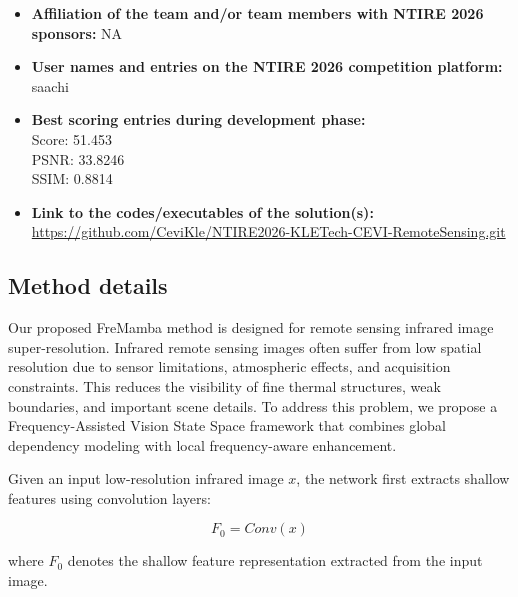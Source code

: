 \documentclass[conference]{IEEEtran}
\begin{document}
\begin{itemize}
\item \textbf{Affiliation of the team and/or team members with NTIRE 2026 sponsors:} NA

\item \textbf{User names and entries on the NTIRE 2026 competition platform:}\\saachi

\item \textbf{Best scoring entries during development phase:}\\Score: 51.453\\PSNR: 33.8246\\SSIM: 0.8814

\item \textbf{Link to the codes/executables of the solution(s):}
\href{https://github.com/CeviKle/NTIRE2026-KLETech-CEVI-RemoteSensing.git}{https://github.com/CeviKle/NTIRE2026-KLETech-CEVI-RemoteSensing.git}

\end{itemize}

\subsection{Method details}

Our proposed FreMamba method is designed for remote sensing infrared image super-resolution. Infrared remote sensing images often suffer from low spatial resolution due to sensor limitations, atmospheric effects, and acquisition constraints. This reduces the visibility of fine thermal structures, weak boundaries, and important scene details. To address this problem, we propose a Frequency-Assisted Vision State Space framework that combines global dependency modeling with local frequency-aware enhancement.

Given an input low-resolution infrared image $x$, the network first extracts shallow features using convolution layers:

\begin{equation}
F_{0} = Conv(x)
\end{equation}

where $F_{0}$ denotes the shallow feature representation extracted from the input image.
\end{document}
